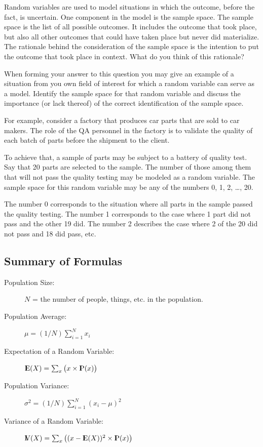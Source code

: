 \documentclass[]{krantz}
\newcommand{\Expec}{{\rm I\kern-.3em E}}
\newcommand{\Prob}{{\rm I\kern-.3em P}}
\newcommand{\Var}{{\rm I\kern-.3em V}}
\theoremstyle{definition}
\theoremstyle{definition}
\theoremstyle{definition}
\theoremstyle{remark}
\begin{document}
Random variables are used to model situations in which the outcome,
before the fact, is uncertain. One component in the model is the sample
space. The sample space is the list of all possible outcomes. It
includes the outcome that took place, but also all other outcomes that
could have taken place but never did materialize. The rationale behind
the consideration of the sample space is the intention to put the
outcome that took place in context. What do you think of this rationale?

When forming your answer to this question you may give an example of a
situation from you own field of interest for which a random variable can
serve as a model. Identify the sample space for that random variable and
discuss the importance (or lack thereof) of the correct identification
of the sample space.

For example, consider a factory that produces car parts that are sold to
car makers. The role of the QA personnel in the factory is to validate
the quality of each batch of parts before the shipment to the client.

To achieve that, a sample of parts may be subject to a battery of
quality test. Say that 20 parts are selected to the sample. The number
of those among them that will not pass the quality testing may be
modeled as a random variable. The sample space for this random variable
may be any of the numbers 0, 1, 2, \ldots{}, 20.

The number 0 corresponds to the situation where all parts in the sample
passed the quality testing. The number 1 corresponds to the case where 1
part did not pass and the other 19 did. The number 2 describes the case
where 2 of the 20 did not pass and 18 did pass, etc.

\hypertarget{summary-of-formulas}{%
\subsection*{Summary of Formulas}\label{summary-of-formulas}}


\begin{description}
\item[Population Size:]
\(N\) = the number of people, things, etc. in the population.
\item[Population Average:]
\(\mu = (1/N)\sum_{i=1}^N x_i\)
\item[Expectation of a Random Variable:]
\(\Expec(X) = \sum_x \big(x \times \Prob(x)\big)\)
\item[Population Variance:]
\(\sigma^2 = (1/N)\sum_{i=1}^N (x_i-\mu)^2\)
\item[Variance of a Random Variable:]
\(\Var(X) = \sum_x\big( (x-\Expec(X))^2 \times \Prob(x)\big)\)
\end{description}
\end{document}
